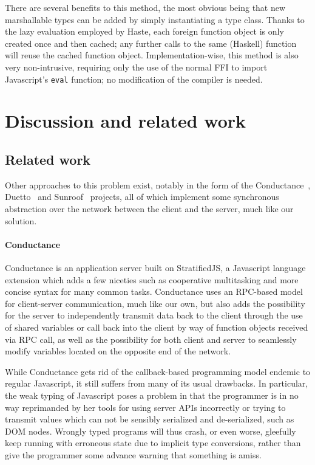 \documentclass[preprint]{sigplanconf}
\begin{document}
There are several benefits to this method, the most obvious being that new
marshallable types can be added by simply instantiating a type class. Thanks
to the lazy evaluation employed by Haste, each foreign function object is only
created once and then cached; any further calls to the same (Haskell) function
will reuse the cached function object. Implementation-wise, this method is also
very non-intrusive, requiring only the use of the normal FFI to import
Javascript's \lstinline!eval! function; no modification of the compiler is
needed.

\section{Discussion and related work}

\subsection{Related work}

Other approaches to this problem exist, notably in the form of the
Conductance\ \cite{conductance}, Duetto\ \cite{duetto} and
Sunroof\ \cite{sunroof} projects, all of which implement some synchronous
abstraction over the network between the client and the server, much like our
solution.

\paragraph{Conductance} Conductance is an application server built on
StratifiedJS, a Javascript language extension which adds a few niceties such as
cooperative multitasking and more concise syntax for many common tasks.
Conductance uses an RPC-based model for client-server communication, much like
our own, but also adds the possibility for the server to independently transmit
data back to the client through the use of shared variables or call back into
the client by way of function objects received via RPC call, as well as the
possibility for both client and server to seamlessly modify variables located
on the opposite end of the network.

While Conductance gets rid of the callback-based programming model endemic to
regular Javascript, it still suffers from many of its usual drawbacks. In
particular, the weak typing of Javascript poses a problem in that the
programmer is in no way reprimanded by her tools for using server APIs
incorrectly or trying to transmit values which can not be sensibly serialized
and de-serialized, such as DOM nodes. Wrongly typed programs will thus crash, or
even worse, gleefully keep running with erroneous state due to implicit type
conversions, rather than give the programmer some advance warning that something
is amiss.
\end{document}
